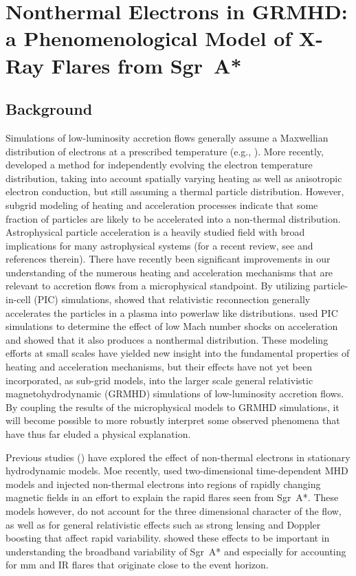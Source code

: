 \chapter[Nonthermal Electrons in GRMHD: a Phenomenological model of X-ray Flares from Sgr~A*]
{Nonthermal Electrons in GRMHD: a Phenomenological Model of X-Ray Flares from Sgr~A*}

\section{Background}
Simulations of low-luminosity accretion flows generally assume a Maxwellian distribution of electrons at a prescribed temperature (e.g., \citealt{dexter2012, drappeau2013, moscibrodzka2014, chan2015b}).  More recently, \citet{ressler2015} developed a method for independently evolving the electron temperature distribution, taking into account spatially varying heating as well as anisotropic electron conduction, but still assuming a thermal particle distribution.  However, subgrid
modeling of heating and acceleration processes indicate that some fraction of particles are likely to be accelerated
into a non-thermal distribution.  Astrophysical particle acceleration is a heavily studied field with broad implications for many astrophysical systems (for a recent review, see \citealt{Lazarian2012} and references therein). There have recently been significant improvements in our understanding of the numerous heating and acceleration mechanisms that are relevant to accretion flows from a microphysical standpoint.  By utilizing particle-in-cell (PIC) simulations, \citet{sironi2014} showed that relativistic reconnection generally accelerates the particles in a plasma into powerlaw like distributions. \citet{guo2014} used PIC simulations to determine the effect of low Mach number shocks
on acceleration and showed that it also produces a nonthermal distribution. These modeling efforts at small
scales have yielded new insight into the fundamental properties of heating and acceleration mechanisms, but
their effects have not yet been incorporated, as sub-grid models, into the larger scale general relativistic magnetohydrodynamic (GRMHD) simulations of low-luminosity accretion flows. By coupling the results of the microphysical models to GRMHD simulations, it will become possible to more robustly interpret some observed phenomena that have thus far eluded a physical explanation.

Previous studies (\citealt{mahadevan1998, ozel2000, yuan2003}) have explored the effect of non-thermal electrons in stationary hydrodynamic models.  Moe recently, \citet{dodds-eden2010} used two-dimensional time-dependent MHD models and injected non-thermal electrons into regions of rapidly changing magnetic fields in an effort to explain the rapid flares seen from Sgr~A*.  These models however, do not account for the three dimensional character of the flow, as well as for general relativistic effects such as strong lensing and Doppler boosting that affect rapid variability.  \citet{chan2015a} showed these effects to be important in understanding the broadband variability of Sgr~A* and especially for accounting for mm and IR flares that originate close to the event horizon.

